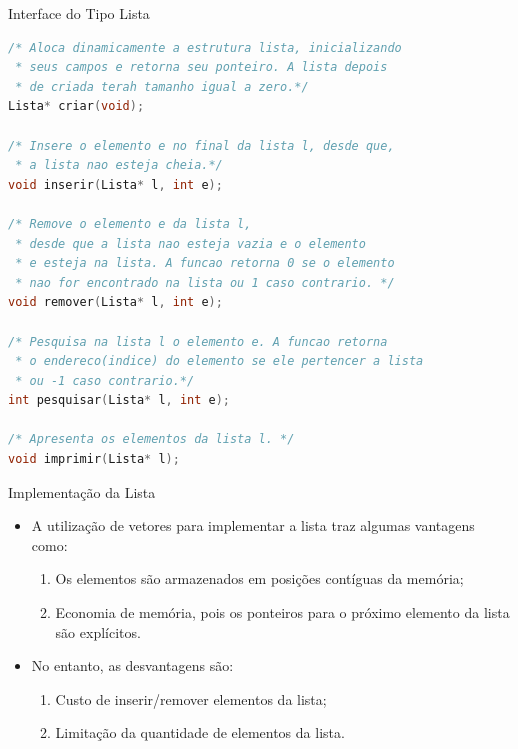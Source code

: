 \begin{frame}{Interface do Tipo Lista}
\footnotesize
\begin{lstlisting}[language=C]
/* Aloca dinamicamente a estrutura lista, inicializando 
 * seus campos e retorna seu ponteiro. A lista depois 
 * de criada terah tamanho igual a zero.*/
Lista* criar(void);

/* Insere o elemento e no final da lista l, desde que,
 * a lista nao esteja cheia.*/
void inserir(Lista* l, int e);

/* Remove o elemento e da lista l,
 * desde que a lista nao esteja vazia e o elemento
 * e esteja na lista. A funcao retorna 0 se o elemento 
 * nao for encontrado na lista ou 1 caso contrario. */
void remover(Lista* l, int e);

/* Pesquisa na lista l o elemento e. A funcao retorna 
 * o endereco(indice) do elemento se ele pertencer a lista
 * ou -1 caso contrario.*/
int pesquisar(Lista* l, int e);

/* Apresenta os elementos da lista l. */
void imprimir(Lista* l);
\end{lstlisting}
\end{frame}

\begin{frame}{Implementação da Lista}
\begin{itemize}
	\item A utilização de vetores para implementar a lista traz algumas vantagens como:	
		\begin{enumerate}
			\item Os elementos são armazenados em posições contíguas da memória;
			\item Economia de memória, pois os ponteiros para o próximo elemento da lista são explícitos.
		\end{enumerate}
		\item No entanto, as desvantagens são:		
			\begin{enumerate}
				\item Custo de inserir/remover elementos da lista;
				\item Limitação da quantidade de elementos da lista.
			\end{enumerate}
\end{itemize}
\end{frame}


